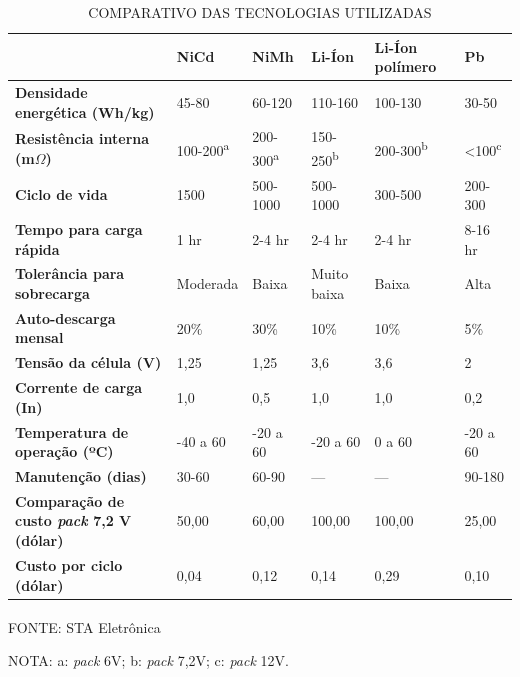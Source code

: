 \documentclass[
	12pt,				%
	openright,			%
	oneside,			%
	a4paper,			%
	english,			%
	french,				%
	spanish,			%
	brazil,				%
	oldfontcommands
	]{abntex2}
\begin{document}
	\begin{table}[th]
		\caption{COMPARATIVO DAS TECNOLOGIAS UTILIZADAS}
		\label{Tab_Bateria}
		\begin{tabular}{p{3.5cm}|p{1.6cm}|p{1.6cm}|p{1.6cm}|p{2cm}|p{1.6cm}}
	 	& \textbf{NiCd} & \textbf{NiMh} & \textbf{Li-Íon} & \textbf{Li-Íon polímero} & \textbf{Pb} \\
	 	\hline
		\textbf{Densidade energética (Wh/kg)} & 45-80 & 60-120 & 110-160 & 100-130 & 30-50 \\
	 	\hline
	 	\textbf{Resistência interna (m$\Omega$)} & 100-200\textsuperscript{a} & 200-300\textsuperscript{a} & 150-250\textsuperscript{b} & 200-300\textsuperscript{b} & <100\textsuperscript{c} \\
	 	\hline
	 	\textbf{Ciclo de vida} & 1500 & 500-1000 & 500-1000 & 300-500 & 200-300 \\
		\hline
		\textbf{Tempo para carga rápida} & 1 hr & 2-4 hr & 2-4 hr & 2-4 hr & 8-16 hr \\
		\hline
		\textbf{Tolerância para sobrecarga} & Moderada & Baixa & Muito baixa & Baixa & Alta \\
		\hline
		\textbf{Auto-descarga mensal} & 20\% & 30\% & 10\% & 10\% & 5\% \\
		\hline
		\textbf{Tensão da célula (V)} & 1,25 & 1,25 & 3,6 & 3,6 & 2 \\
		\hline
		\textbf{Corrente de carga (In)} & 1,0 & 0,5 & 1,0 & 1,0 & 0,2 \\
		\hline
		\textbf{Temperatura de operação (ºC)} & -40 a 60 & -20 a 60 & -20 a 60 & 0 a 60 & -20 a 60 \\
		\hline
		\textbf{Manutenção (dias)} & 30-60 & 60-90 & --- & --- & 90-180 \\
		\hline
		\textbf{Comparação de custo \textit{pack} 7,2 V (dólar)} & 50,00 & 60,00 & 100,00 & 100,00 & 25,00 \\
		\hline
		\textbf{Custo por ciclo (dólar)} & 0,04 & 0,12 & 0,14 & 0,29 & 0,10 \\
		\hline 
		\end{tabular}
	\centering
	\begin{small}
	\vspace{3pt}
		FONTE: STA Eletrônica\textsuperscript{\cite{sta}}
	\end{small}
	
	\begin{footnotesize}
		NOTA: a: \textit{pack} 6V; b: \textit{pack} 7,2V; c: \textit{pack} 12V.
	\end{footnotesize}
	\end{table}
\end{document}
